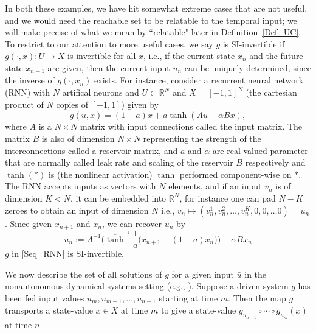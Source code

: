 \documentclass[12 pt]{article}
\begin{document}
In both these examples, we have hit somewhat extreme cases that are not useful, and we would need the reachable set to be relatable to the temporal input; we will make precise of what we mean by ``relatable" later in Definition~\ref{Def_UC}. To restrict to our attention to more useful cases, we  say $g$ is SI-invertible if $g(\cdot,x):U \to X$ is invertible for all $x$, i.e., if the current state $x_n$ and the future state $x_{n+1}$ are given, then the current input $u_n$ can be uniquely determined, since  the inverse of   $g(\cdot,x_n)$ exists. For instance, consider a recurrent neural network (RNN) with  $N$ artifical neurons and $U \subset \mathbb{R}^N$
and $X=[-1,1]^N$ (the cartesian product of $N$ copies of $[-1,1]$) given by
\begin{equation} \label{Seq_RNN}
	g(u,x) = (1-a)x + a\overline{\tanh}(Au + \alpha Bx),
\end{equation}
where $A$ is a $N \times N$ matrix with input connections called the input matrix. The matrix $B$ is also of dimension $N \times N$ representing the strength of the interconnections called a reservoir matrix, and $a$ and $\alpha$ are real-valued parameter that are normally called  leak rate and scaling of the reservoir 
 $B$ respectively and $\overline{\tanh}(*)$ is (the nonlinear activation) $\tanh$ performed component-wise on $*$.  The RNN accepts inputs as vectors with $N$ elements, and if an input $v_n$ is of dimension $K<N$, it can be embedded into $\mathbb{R}^N$, for instance one can pad $N-K$ zeroes to obtain an input of dimension $N$ i.e., $v_n \mapsto (v^1_n,v^2_n,\ldots,v^K_n,0,0,\ldots 0) = u_n$. Since  given $x_{n+1}$ and $x_n$, we can recover $u_n$ by
\begin{equation} \label{eqn_SI_RNN}
u_n := A^{-1}\bigg(\overline{\tanh}^{^{-1}}\frac{1}{a}\Big(x_{n+1}-(1-a)x_n\Big) \bigg) - \alpha B x_n
\end{equation}
$g$ in \eqref{Seq_RNN} is SI-invertible. 


We now describe the set of all solutions of $g$ for a given input $\bar{u}$ in the nonautonomous dynamical systems setting (e.g., \cite{kloeden2011nonautonomous, Manju_ESP}). Suppose a driven system $g$ has been fed input values $u_{m},u_{m+1},\ldots,u_{n-1}$ starting at time $m$. Then the map $g$ transports a state-value $x\in X$ at time $m$ to give a state-value $g_{u_{n-1}}\circ \cdots \circ g_{u_{m}}(x)$ at time $n$.    
\end{document}
